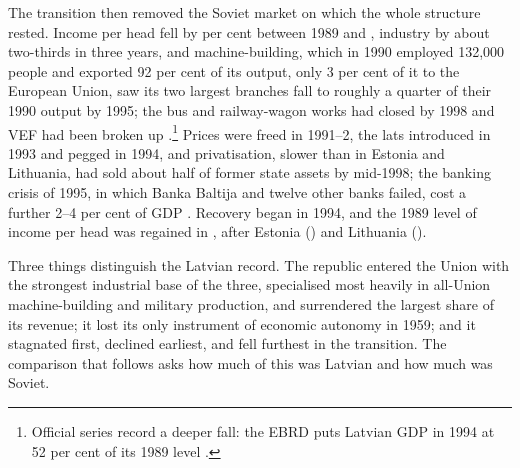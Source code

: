 The transition then removed the Soviet market on which the whole structure rested. Income per head fell by \lvTROUGHpct{} per cent between 1989 and \lvTROUGHyear{}, industry by about two-thirds in three years, and machine-building, which in 1990 employed 132,000 people and exported 92 per cent of its output, only 3 per cent of it to the European Union, saw its two largest branches fall to roughly a quarter of their 1990 output by 1995; the bus and railway-wagon works had closed by 1998 and VEF had been broken up \parencites[925--9]{silins_2017_metalapstrade}[130]{soms_2015_latvijas}.\footnote{Official series record a deeper fall: the EBRD puts Latvian GDP in 1994 at 52 per cent of its 1989 level \parencite[13]{kukk_2014_road}.} Prices were freed in 1991--2, the lats introduced in 1993 and pegged in 1994, and privatisation, slower than in Estonia and Lithuania, had sold about half of former state assets by mid-1998; the banking crisis of 1995, in which Banka Baltija and twelve other banks failed, cost a further 2--4 per cent of GDP \parencites[811--15]{krastins_2017_kreditiestades}[142]{bitans_2012_development}[205--9]{jeffries_2004_countries}. Recovery began in 1994, and the 1989 level of income per head was regained in \lvREGAINeightynine{}, after Estonia (\eeREGAINeightynine{}) and Lithuania (\ltREGAINeightynine{}).

Three things distinguish the Latvian record. The republic entered the Union with the strongest industrial base of the three, specialised most heavily in all-Union machine-building and military production, and surrendered the largest share of its revenue; it lost its only instrument of economic autonomy in 1959; and it stagnated first, declined earliest, and fell furthest in the transition. The comparison that follows asks how much of this was Latvian and how much was Soviet.
